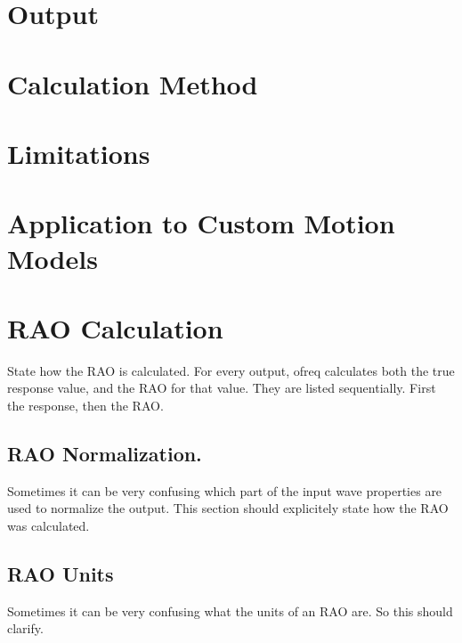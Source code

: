\section*{Output}

\section*{Calculation Method}

\section*{Limitations}

\section*{Application to Custom Motion Models}

\section*{R\-A\-O Calculation}

State how the R\-A\-O is calculated. For every output, ofreq calculates both the true response value, and the R\-A\-O for that value. They are listed sequentially. First the response, then the R\-A\-O.

\subsection*{R\-A\-O Normalization.}

Sometimes it can be very confusing which part of the input wave properties are used to normalize the output. This section should explicitely state how the R\-A\-O was calculated.

\subsection*{R\-A\-O Units}

Sometimes it can be very confusing what the units of an R\-A\-O are. So this should clarify. 